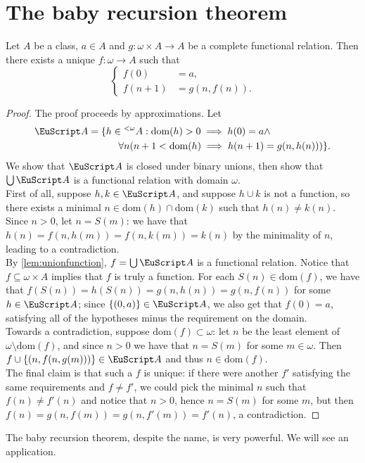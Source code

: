 \documentclass[twoside,openright,titlepage,numbers=noenddot,%
               headinclude,footinclude,cleardoublepage=empty,abstract=on,
               BCOR=23mm,paper=letter,fontsize=11pt
               ]{scrreprt}
\begin{document}
\section{The baby recursion theorem}
\begin{theorem}
    Let $A$ be a class, $a \in A$ and $g: \omega \times A \to A$ be a complete functional relation. Then there exists a unique $f: \omega \to A$ such that
    \begin{equation*}
        \begin{cases}
            f(0) &= a, \\
            f(n+1) &= g(n,f(n)).
        \end{cases}
    \end{equation*}
\end{theorem}
\begin{proof}
    The proof proceeds by approximations. Let
    \begin{align*}
    \A = \{h \in {}^{<\omega}A: \mathrm{dom}(h) > 0 \implies h(0) = a &\land \\ \forall n(n+1 < \mathrm{dom}(h) \implies h(n+1) &= g(n, h(n))) \}.
    \end{align*}
    We show that $\A$ is closed under binary unions, then show that $\bigcup \A$ is a functional relation with domain $\omega$. \\
    First of all, suppose $h,k \in \A$, and suppose $h \cup k$ is not a function, so there exists a minimal $n \in \mathrm{dom}(h) \cap \mathrm{dom}(k)$ such that $h(n) \neq k(n)$. Since $n > 0$, let $n = S(m)$: we have that $h(n) = f(n,h(m)) = f(n,k(m)) = k(n)$ by the minimality of $n$, leading to a contradiction. \\
    By \ref{lem:unionfunction}, $f = \bigcup \A$ is a functional relation. Notice that $f \subseteq \omega \times A$ implies that $f$ is truly a function. For each $S(n) \in \mathrm{dom}(f)$, we have that $f(S(n)) = h(S(n)) = g(n,h(n)) = g(n,f(n))$ for some $h \in \A$; since $\{(0,a)\} \in \A$, we also get that $f(0) = a$, satisfying all of the hypotheses minus the requirement on the domain. \\
    Towards a contradiction, suppose $\mathrm{dom}(f) \subset \omega$: let $n$ be the least element of $\omega \setminus \mathrm{dom}(f)$, and since $n > 0$ we have that $n = S(m)$ for some $m \in \omega$. Then $f \cup \{(n, f(n,g(m)))\} \in \A$ and thus $n \in \mathrm{dom}(f)$. \\
    The final claim is that such a $f$ is unique: if there were another $f'$ satisfying the same requirements and $f \neq f'$, we could pick the minimal $n$ such that $f(n) \neq f'(n)$ and notice that $n > 0$, hence $n = S(m)$ for some $m$, but then $f(n) = g(n,f(m)) = g(n,f'(m)) = f'(n)$, a contradiction.
\end{proof}
The baby recursion theorem, despite the name, is very powerful. We will see an application.
\end{document}
